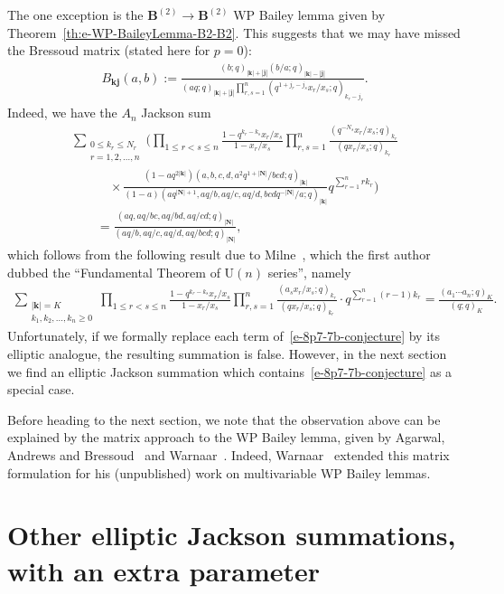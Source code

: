 \documentclass[pdftex]{sigma}
\numberwithin{equation}{section}
\newcommand{\sumN}{{\left| \boldsymbol{N} \right|}}
\newcommand\sumj{{\left| \boldsymbol {j} \right|}}
\newcommand\sumk{{\left| \boldsymbol{k} \right|}}
\newcommand{\B}{{ \mathbf B}}
\renewcommand{\k}{{ \boldsymbol{k}}}
\renewcommand{\j}{{ \boldsymbol{j}}}
\newcommand{\multsum}[3]{{\sum\limits_{\substack{{0\le #1_#3 \le #2_#3} \\
{#3 =1,2,\dots, n}}}}}
\newcommand{\qrfac}[2]{{\left({#1}; q\right)_{#2}}} %
\newcommand{\triprod}[1]{\prod\limits_{1\le r < s \le #1}}
\newcommand{\sqprod}[1]{\prod\limits_{r, s =1}^{#1}} %
\newcommand{\xover}[1]{#1_{r}/#1_{s}}
\newcommand{\vandermonde}[3]{\triprod{#3} %
 \frac{1-q^{#2_r-#2_s} \xover {#1} }{1-\xover{#1}}
}
\begin{document}
The one exception is the $\B^{(2)} \to\B^{(2)}$ WP Bailey lemma given by Theorem~\ref{th:e-WP-BaileyLemma-B2-B2}. This suggests that we may have missed the Bressoud matrix (stated here for $p=0$):
\begin{gather*}
 B_{\k \j}(a,b) := \frac{\qrfac{b}{\sumk+\sumj}
 \qrfac{b/a}{\sumk-\sumj}}{\qrfac{aq}{\sumk+\sumj} \sqprod n \qrfac{q^{1+j_r-j_s}\xover x }{k_r-j_r} } .
 \end{gather*}
Indeed, we have the $A_n$ Jackson sum
\begin{gather}
\multsum{k}{N}{r} \Bigg( \vandermonde{x}{k}{n}
\sqprod n \frac{\qrfac{q^{-N_s}\xover{x}}{k_r} }{\qrfac{q\xover{x}}{k_r} } \nonumber\\
\qquad\quad{} \times \frac {(1-aq^{2\sumk}) \qrfac{a, b, c, d, a^2q^{1+\sumN}/b c d}{\sumk}}
{(1-a)\qrfac{aq^{\sumN+1}, aq/b , aq/c, aq/d, b c dq^{-\sumN}/a}{\sumk}}
 q^{\sum\limits_{r=1}^n rk_r}
 \Bigg)\nonumber\\
\qquad{} =\frac{\qrfac{aq, aq/b c, aq/b d, aq/cd}{\sumN}} {\qrfac{aq/b , aq/c, aq/d, aq/b c d}{\sumN}},\label{e-8p7-7b-conjecture}
\end{gather}
which follows from the following result due to Milne~\cite{Milne1997}, which the first author~\cite{GB1995} dubbed the ``Fundamental Theorem of ${\mathrm U}(n)$ series'', namely
\begin{gather}\label{fundamental-theorem}
\sum\limits_{\substack{\sumk = K \\
k_1,k_2, \dots, k_n\geq 0} }\!
 \vandermonde{x}{k}{n}\!
\sqprod n \frac{\qrfac{a_s\xover{x}}{k_r} }{\qrfac{q\xover{x}}{k_r} }
\cdot q^{\sum\limits_{r=1}^n (r-1)k_r}
= \frac{\qrfac{a_1\cdots a_n}{K}}{\qrfac{q}{K}} .\!\!\!
\end{gather}
Unfortunately, if we formally replace each term of~\eqref{e-8p7-7b-conjecture} by its elliptic analogue, the resulting summation is false. However, in the next section we find an elliptic Jackson summation which contains~\eqref{e-8p7-7b-conjecture} as a special case.

Before heading to the next section, we note that the observation above can be explained by the matrix approach to the WP Bailey lemma, given by Agarwal, Andrews and Bressoud~\cite{AAB1988} and Warnaar~\cite{SOW2003}. Indeed, Warnaar~\cite{SOW-notes-2016} extended this matrix formulation for his (unpublished) work on multivariable WP Bailey lemmas.

\section{Other elliptic Jackson summations, with an extra parameter}\label{sec:new-dougall}
\end{document}
